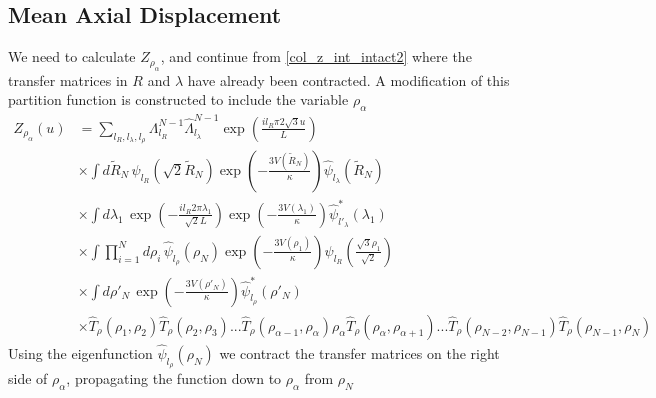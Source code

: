 \subsection{Mean Axial Displacement}
%
We need to calculate $Z_{\rho_{\alpha}}$, and continue from \eqref{col_z_int_intact2} where the transfer matrices in $R$ and $\lambda$ have already been contracted. A modification of this partition function is constructed to include the variable $\rho_{\alpha}$
%
\begin{align}\label{col_mxd_z_rho1}
Z_{\rho_\alpha}\left(u\right) &= \sum_{l_R,l_\lambda,l_\rho}\Lambda_{l_R}^{N-1}\hat{\Lambda}_{l_\lambda}^{N-1}\exp\left(\frac{il_{R}\pi 2\sqrt{3}u}{L}\right)\nonumber\\
&\times\int d\tilde{R}_N\,\psi_{l_R}\left(\sqrt{2}\tilde{R}_{N}\right)\exp\left(-\frac{3V\left(\tilde{R}_N\right)}{\kappa}\right)\hat{\psi}_{l_\lambda}\left(\tilde{R}_N\right)\nonumber\\
&\times\int d\lambda_{1}\,\exp\left(-\frac{il_{R}2\pi\lambda_1}{\sqrt{2}L} \right)\exp\left(-\frac{3V(\lambda_{1})}{\kappa}\right)\hat{\psi}^{*}_{l'_\lambda}\left(\lambda_{1}\right)\nonumber\\
&\times\int\prod^{N}_{i=1}d\rho_i\,\hat{\psi}_{l_\rho}\left(\rho_{N}\right) \exp\left(-\frac{3V(\rho_{1})}{\kappa}\right)\psi_{l_R}\left( \frac{\sqrt{3}\rho_1}{\sqrt{2}}\right)\nonumber\\
&\times\int d\rho'_N\,\exp\left(-\frac{3V(\rho'_{N})}{\kappa}\right)\hat{\psi}^{*}_{l_\rho}\left(\rho'_{N}\right)\nonumber\\
&\times \hat{T}_{\rho}(\rho_1,\rho_2)\hat{T}_{\rho}(\rho_2,\rho_3)...\hat{T}_{\rho}(\rho_{\alpha-1},\rho_{\alpha})\rho_{\alpha}\hat{T}_{\rho}(\rho_{\alpha},\rho_{\alpha+1})...\hat{T}_{\rho}(\rho_{N-2},\rho_{N-1})\hat{T}_{\rho}(\rho_{N-1},\rho_N)
\end{align}
%
Using the eigenfunction $\hat{\psi}_{l_\rho}\left(\rho_{N}\right)$ we contract the transfer matrices on the right side of $\rho_{\alpha}$, propagating the function down to $\rho_\alpha$ from $\rho_N$ 
%
